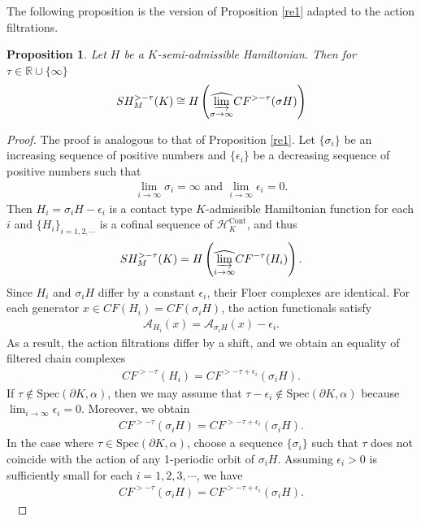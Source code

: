 \documentclass[12pt]{amsart}
\newtheorem{proposition}[theorem]{Proposition}
\theoremstyle{definition}
\newcommand{\RR}{{\mathbb R}}
\begin{document}
The following proposition is the version of Proposition \ref{re1} adapted to the action filtrations.
\begin{proposition}\label{prop1}
    Let $H$ be a $K$-semi-admissible Hamiltonian. Then for $\tau\in\RR\cup\{\infty\}$
    \begin{align*} 
        SH^{> -\tau}_M(K) \cong H\left( \widehat{\varinjlim_{\sigma \to \infty }} CF^{> -\tau}(\sigma H) \right) 
    \end{align*}
\end{proposition}
\begin{proof}
The proof is analogous to that of Proposition \ref{re1}. Let $\{\sigma_i\}$ be an increasing sequence of positive numbers and $\{\epsilon_i\}$ be a decreasing sequence of positive numbers such that
\begin{align*}
    \lim_{i \to \infty} \sigma_i = \infty \,\,\textrm{and}\,\,\lim_{i \to \infty} \epsilon_i = 0.
\end{align*}
Then $H_i = \sigma_iH - \epsilon_i$ is a contact type $K$-admissible Hamiltonian function for each $i$ and $\{H_i\}_{i=1,2,\cdots}$ is a cofinal sequence of $\mathcal{H}_K^{\text{Cont}}$, and thus
\begin{align*}
    SH^{> -\tau}_M(K) = H \left( \widehat{\varinjlim_{i \to \infty}}CF^{-\tau}(H_i) \right).
\end{align*}
Since $H_i$ and $\sigma_i H$ differ by a constant $\epsilon_i$, their Floer complexes are identical. For each generator $x \in CF(H_i) = CF(\sigma_iH)$, the action functionals satisfy
\begin{align*}
    \mathcal{A}_{H_i}(x) = \mathcal{A}_{\sigma_iH}(x) - \epsilon_i.
\end{align*}
As a result, the action filtrations differ by a shift, and we obtain an equality of filtered chain complexes
\begin{align*}
CF^{>-\tau}(H_i)
= CF^{>-\tau+\epsilon_i}(\sigma_i H).
\end{align*}
If $\tau \notin \textrm{Spec}(\partial K, \alpha) $, then we may assume that $\tau-\epsilon_i \notin \textrm{Spec}(\partial K, \alpha)$ because $\displaystyle\lim_{i \to \infty} \epsilon_i = 0$. Moreover, we obtain
\begin{align*}
     CF^{>-\tau}(\sigma_iH) = CF^{>-\tau +\epsilon_i}(\sigma_iH).
\end{align*}
In the case where $\tau \in \textrm{Spec}(\partial K, \alpha) $, choose a sequence $\{\sigma_i\}$ such that $\tau$ does not coincide with the action of any 1-periodic orbit of $\sigma_iH$. Assuming $\epsilon_i>0$ is sufficiently small for each $i=1,2,3,\cdots$, we have
\begin{align*}
    CF^{>-\tau}(\sigma_iH) = CF^{>-\tau+\epsilon_i}(\sigma_iH).
\end{align*}\


\end{proof}
\end{document}
